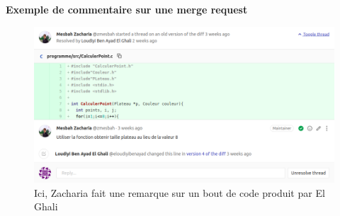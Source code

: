 \begin{center}
\textbf{Exemple de commentaire sur une merge request}
\end{center}
\begin{figure}[h]
  \includegraphics[width=18cm]{./sourcesIMAGES/exemple_merge_request.png}
  \caption{Ici, Zacharia fait une remarque sur un bout de code produit par El Ghali}
\end{figure}
